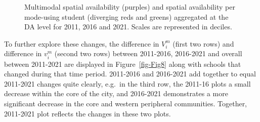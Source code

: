 \documentclass[
default
]{sn-jnl}
\begin{document}
\begin{figure}[H]


\caption{\label{fig-Fig7}Multimodal spatial availability (purples) and
spatial availability per mode-using student (diverging reds and greens)
aggregated at the DA level for 2011, 2016 and 2021. Scales are
represented in deciles.}

\end{figure}%

To further explore these changes, the difference in \(V_i^m\) (first two
rows) and difference in \(v_i^m\) (second two rows) between 2011-2016,
2016-2021 and overall between 2011-2021 are displayed in
Figure~\ref{fig-Fig8} along with schools that changed during that time
period. 2011-2016 and 2016-2021 add together to equal 2011-2021 changes
quite clearly, e.g.~in the third row, the 2011-16 plots a small decrease
within the core of the city, and 2016-2021 demonstrates a more
significant decrease in the core and western peripheral communities.
Together, 2011-2021 plot reflects the changes in these two plots.
\end{document}
